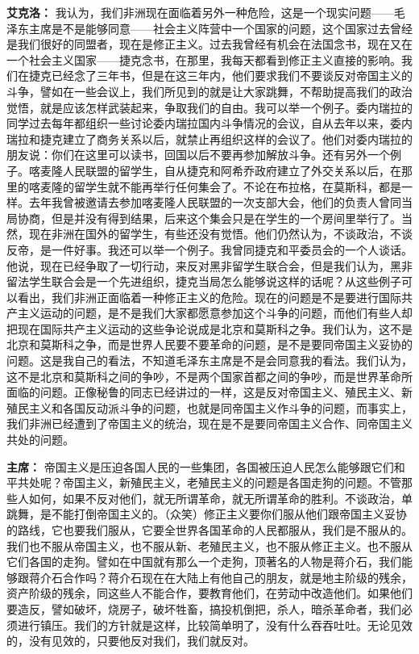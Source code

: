 \begin{list}{}
\item[\textbf{艾克洛：}] 我认为，我们非洲现在面临着另外一种危险，这是一个现实问题——毛泽东主席是不是能够同意——社会主义阵营中一个国家的问题，这个国家过去曾经是我们很好的同盟者，现在是修正主义。过去我曾经有机会在法国念书，现在又在一个社会主义国家——捷克念书，在那里，我每天都看到修正主义直接的影响。我们在捷克已经念了三年书，但是在这三年内，他们要求我们不要谈反对帝国主义的斗争，譬如在一些会议上，我们所见到的就是让大家跳舞，不帮助提高我们的政治觉悟，就是应该怎样武装起来，争取我们的自由。我可以举一个例子。委内瑞拉的同学过去每年都组织一些讨论委内瑞拉国内斗争情况的会议，自从去年以来，委内瑞拉和捷克建立了商务关系以后，就禁止再组织这样的会议了。他们对委内瑞拉的朋友说：你们在这里可以读书，回国以后不要再参加解放斗争。还有另外一个例子。喀麦隆人民联盟的留学生，自从捷克和阿希乔政府建立了外交关系以后，在那里的喀麦隆的留学生就不能再举行任何集会了。不论在布拉格，在莫斯科，都是一样。去年我曾被邀请去参加喀麦隆人民联盟的一次支部大会，他们的负责人曾同当局协商，但是并没有得到结果，后来这个集会只是在学生的一个房间里举行了。当然，现在非洲在国外的留学生，有些还没有觉悟。他们仍然认为，不谈政治，不谈反帝，是一件好事。我还可以举一个例子。我曾同捷克和平委员会的一个人谈话。他说，现在已经争取了一切行动，来反对黑非留学生联合会，但是我们认为，黑非留法学生联合会是一个先进组织，捷克当局怎么能够说这样的话呢？从这些例子可以看出，我们非洲正面临着一种修正主义的危险。现在的问题是不是要进行国际共产主义运动的问题，是不是我们大家都愿意参加这个斗争的问题，而他们有些人却把现在国际共产主义运动的这些争论说成是北京和莫斯科之争。我们认为，这不是北京和莫斯科之争，而是世界人民要不要革命的问题，是不是要同帝国主义妥协的问题。这是我自己的看法，不知道毛泽东主席是不是会同意我的看法。我们认为，这不是北京和莫斯科之间的争吵，不是两个国家首都之间的争吵，而是世界革命所面临的问题。正像秘鲁的同志已经讲过的一样，这是反对帝国主义、殖民主义、新殖民主义和各国反动派斗争的问题，也就是同帝国主义作斗争的问题，而事实上，我们非洲已经遭到了帝国主义的统治，现在是不是要同帝国主义合作、同帝国主义共处的问题。

\item[\textbf{主席：}] 帝国主义是压迫各国人民的一些集团，各国被压迫人民怎么能够跟它们和平共处呢？帝国主义，新殖民主义，老殖民主义的问题是各国走狗的问题。不管那些人如何，如果不反对他们，就无所谓革命，就无所谓革命的胜利。不谈政治，单跳舞，是不能打倒帝国主义的。（众笑）修正主义要你们服从他们跟帝国主义妥协的路线，它也要我们服从，它要全世界各国革命的人民都服从，我们是不服从的。我们也不服从帝国主义，也不服从新、老殖民主义，也不服从修正主义。也不服从它们各国的走狗。譬如在中国就有那么一个走狗，顶著名的人物是蒋介石，我们能够跟蒋介石合作吗？蒋介石现在在大陆上有他自己的朋友，就是地主阶级的残余，资产阶级的残余，同这些人不能合作，要教育他们，在劳动中改造他们。如果他们要造反，譬如破坏，烧房子，破坏牲畜，搞投机倒把，杀人，暗杀革命者，我们必须进行镇压。我们的方针就是这样，比较简单明了，没有什么吞吞吐吐。无论见效的，没有见效的，只要他反对我们，我们就反对。


\end{list}
